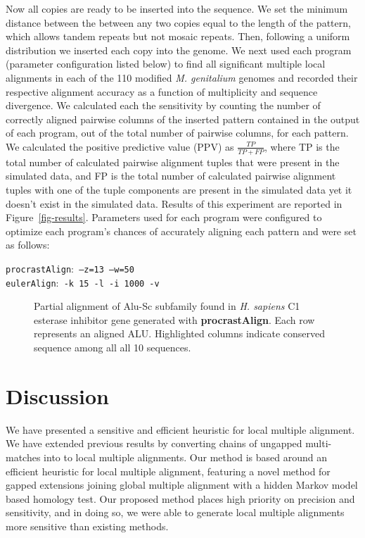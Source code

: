 \documentclass{ws-procs975x65}
\begin{document}
Now all copies are ready to be inserted into the sequence. We set the minimum distance between the between any two copies equal to the length of the pattern, which allows tandem repeats but not mosaic repeats. Then, following a uniform distribution we inserted each copy into the genome.  We next used each program (parameter configuration listed below) to find all significant multiple local alignments in each of the 110 modified \emph{M. genitalium} genomes and recorded their respective alignment accuracy as a function of multiplicity and sequence divergence. We calculated each the sensitivity by counting the number of correctly aligned pairwise columns of the inserted pattern contained in the output of each program, out of the total number of pairwise columns, for each pattern. We calculated the positive predictive value (PPV) as
$\frac{TP}{TP + FP}$, where TP is the total number of calculated pairwise alignment tuples that were present in
the simulated data, and FP is the total number of calculated pairwise alignment tuples with
one of the tuple components are present in the simulated data yet it doesn't exist in the simulated data.  Results of this experiment are reported in Figure~\ref{fig-results}. Parameters used for each program were configured to optimize each program's chances of accurately aligning each pattern and were set as follows:  \begin{center}\texttt{procrastAlign}:\texttt{ --z=13 --w=50 } \\ \texttt{eulerAlign}:\texttt{ -k 15 -l -i 1000 -v}\end{center}


\begin{figure}[t]
\centering {}
\caption{Partial alignment of Alu-Sc subfamily found in \emph{H. sapiens} C1 esterase inhibitor gene generated with \textbf{procrastAlign}. Each row represents an aligned ALU. Highlighted columns indicate conserved sequence among all all 10 sequences.}
\label{fig-align}
\end{figure}

\section{Discussion}

We have presented a sensitive and efficient heuristic for local multiple alignment. We have extended previous results by converting chains of ungapped multi-matches into to local multiple alignments. Our method is based around an efficient heuristic for local multiple alignment, featuring a novel method for gapped extensions joining global multiple alignment with a hidden Markov model based homology test. Our proposed method places high priority on precision and sensitivity, and in doing so, we were able to generate local multiple alignments more sensitive than existing methods. 
\end{document}
